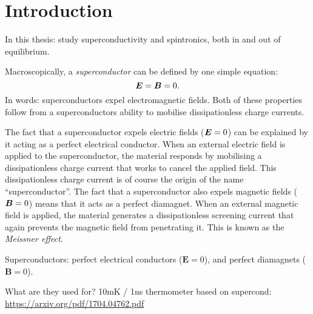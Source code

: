 \chapter{Introduction}\noindent
In this thesis: study superconductivity and spintronics, both in and out of equilibrium.

Macroscopically, a \emph{superconductor} can be defined by one simple equation: 
\begin{equation}
  \bm{E} = \bm{B} = 0.
\end{equation}
In words: superconductors expel electromagnetic fields.
Both of these properties follow from a superconductors ability to mobilise dissipationless charge currents.

The fact that a superconductor expels electric fields ($\bm{E}=0$) can be explained by it acting as a perfect electrical conductor.
When an external electric field is applied to the superconductor, the material responds by mobilising a dissipationless charge current that works to cancel the applied field.
This dissipationless charge current is of course the origin of the name ``superconductor''.
The fact that a superconductor also expels magnetic fields ($\bm{B}=0$) means that it acts as a perfect diamagnet.
When an external magnetic field is applied, the material generates a dissipationless screening current that again prevents the magnetic field from penetrating it.
This is known as the \emph{Meissner effect}.


Superconductors: perfect electrical conductors ($\bm{E} = 0$), and perfect diamagnets ($\bm{B} = 0$).

What are they used for?
10mK / 1ns thermometer based on supercond:
\url{https://arxiv.org/pdf/1704.04762.pdf}

\lipsum
